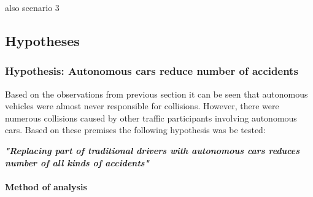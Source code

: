 \documentclass[11pt,english]{article}
\begin{document}






also scenario 3












\subsection{Hypotheses}



\subsubsection{Hypothesis: Autonomous cars reduce number of accidents}


Based on the observations from previous section it can be seen that autonomous vehicles were almost never responsible for collisions. However, there were numerous collisions caused by other traffic participants involving autonomous cars. Based on these premises the following hypothesis was be tested:

\textbf{\textit{"Replacing part of traditional drivers with autonomous cars reduces number of all kinds of accidents"}}

\paragraph{Method of analysis}
\end{document}
